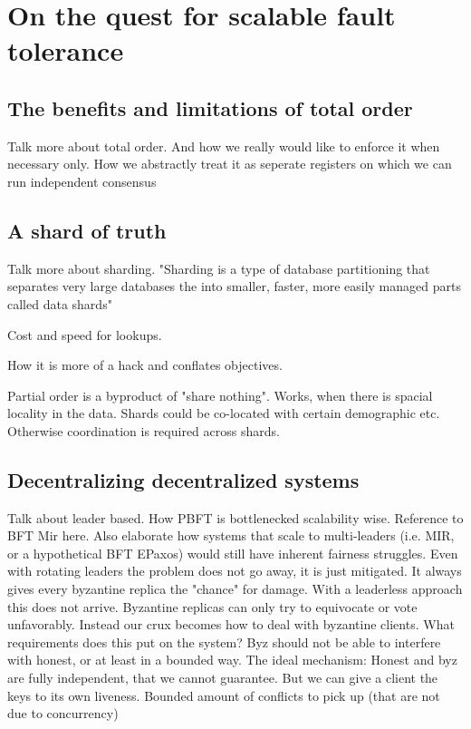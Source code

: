 \section{On the quest for scalable fault tolerance}

\subsection{The benefits and limitations of total order}
Talk more about total order. 
And how we really would like to enforce it when necessary only.
How we abstractly treat it as seperate registers on which we can run independent consensus

\subsection{A shard of truth}
Talk more about sharding.
"Sharding is a type of database partitioning that separates very large databases the into smaller, faster, more easily managed parts called data shards"

Cost and speed for lookups.

How it is more of a hack and conflates objectives.

Partial order is a byproduct of "share nothing". Works, when there is spacial locality in the data. Shards could be co-located with certain demographic etc.  Otherwise coordination is required across shards.


\subsection{Decentralizing decentralized systems}
Talk about leader based. How PBFT is bottlenecked scalability wise. Reference to BFT Mir here. 
Also elaborate how systems that scale to multi-leaders (i.e. MIR, or a hypothetical BFT EPaxos) would still have inherent fairness struggles. Even with rotating leaders the problem does not go away, it is just mitigated. It always gives every byzantine replica the "chance" for damage. With a leaderless approach this does not arrive. Byzantine replicas can only try to equivocate or vote unfavorably.
Instead our crux becomes how to deal with byzantine clients.
What requirements does this put on the system? Byz should not be able to interfere with honest, or at least in a bounded way.
The ideal mechanism: Honest and byz are fully independent, that we cannot guarantee. But we can give a client the keys to its own liveness. Bounded amount of conflicts to pick up (that are not due to concurrency)

